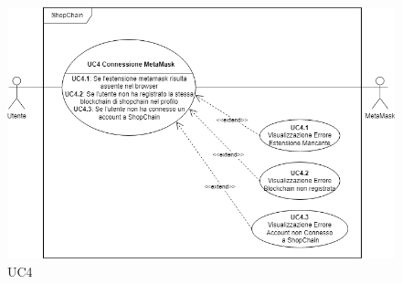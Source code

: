\begin{figure}[H]
    \centering
    \includegraphics[scale=0.7]{immagini/UC4.png}
    \caption{UC4}
\end{figure}

